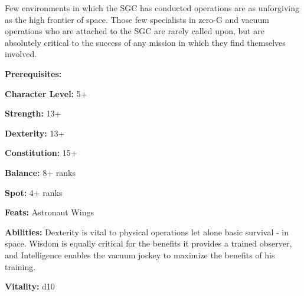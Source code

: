 \begin{multicols}{2}

Few environments in which the SGC has conducted operations are as unforgiving as the high frontier of space. Those few specialists in zero-G and vacuum operations who are attached to the SGC are rarely called upon, but are absolutely critical to the success of any mission in which they find themselves involved.

\columnbreak

\textbf{Prerequisites:} 
\begin{description*}
\item[\hspace{1.5cm}\textbf{Character Level:}] 5+
\item[\hspace{1.5cm}\textbf{Strength:}] 13+
\item[\hspace{1.5cm}\textbf{Dexterity:}] 13+
\item[\hspace{1.5cm}\textbf{Constitution:}] 15+
\item[\hspace{1.5cm}\textbf{Balance:}] 8+ ranks
\item[\hspace{1.5cm}\textbf{Spot:}] 4+ ranks
\item[\hspace{1.5cm}\textbf{Feats:}] Astronaut Wings
\end{description*}

\textbf{Abilities:} Dexterity is vital to physical operations let alone basic survival - in space. Wisdom is equally critical for the benefits it provides a trained observer, and Intelligence enables the vacuum jockey to maximize the benefits of his training.

\textbf{Vitality:} d10

\end{multicols}

\setlength{\intextsep}{-3cm}

